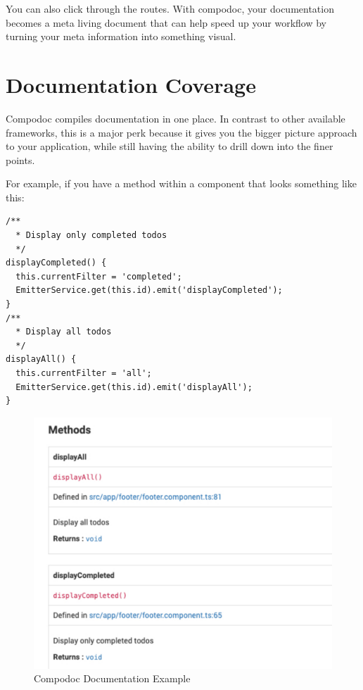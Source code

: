 You can also click through the routes. With compodoc, your documentation becomes a meta living document that can help speed up your workflow by turning your meta information into something visual.


\section{Documentation Coverage}
Compodoc compiles documentation in one place. In contrast to other available frameworks, this is a major perk because it gives you the bigger picture approach to your application, while still having the ability to drill down into the finer points. 

For example, if you have a method within a component that looks something like this: 

\begin{lstlisting}
/**
  * Display only completed todos
  */
displayCompleted() {
  this.currentFilter = 'completed';
  EmitterService.get(this.id).emit('displayCompleted');
}
/**
  * Display all todos
  */
displayAll() {
  this.currentFilter = 'all';
  EmitterService.get(this.id).emit('displayAll');
}
\end{lstlisting}

\begin{figure}
\caption{Compodoc Documentation Example}
\includegraphics[width=414pt]{graphics/compodoc/documentation/documentation-coverage.pdf}
\end{figure}

